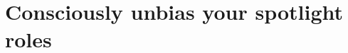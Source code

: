 \documentclass[10pt,letterpaper]{article}
\begin{document}


\section{Consciously unbias your spotlight roles}
\label{rule_unbias}
\end{document}
